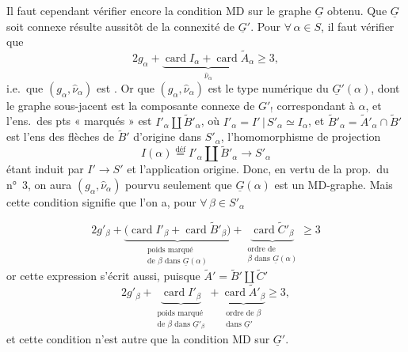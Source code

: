 \documentclass[11pt,a4paper]{article}
\begin{document}
Il faut cependant vérifier encore la condition MD sur le graphe $\underline{G}$ obtenu. Que $\underline{G}$ soit connexe résulte aussitôt de la connexité de $\underline{G}'$. Pour $\forall\, \alpha \in S$, il faut vérifier que
\[
2g_\alpha + \underbrace{\operatorname{card} I_\alpha + \operatorname{card} \widetilde{A}_\alpha}_{\hat{\nu}_\alpha} \geqslant 3,
\]
 i.e.\ que $(g_\alpha, \hat{\nu}_\alpha)$ est . Or 
  que $(g_\alpha, \hat{\nu}_\alpha)$ est le type numérique du  $\underline{G}'(\alpha)$, dont le graphe sous-jacent est la composante connexe de $G'_{!}$ correspondant à $\alpha$, et l'ens.\ des pts « marqués » est $I'_\alpha \amalg \widetilde{B}'_\alpha$, où $I'_\alpha = I' \,|\, S'_\alpha \simeq I_\alpha$, et $\widetilde{B}'_\alpha = \widetilde{A}'_\alpha \cap \widetilde{B}'$ est l'ens des flèches de $\widetilde{B}'$ d'origine dans $S'_\alpha$, l'homomorphisme de projection
\[
I(\alpha) \overset{\text{déf}}{=} I'_\alpha \amalg \widetilde{B}'_\alpha \longrightarrow S'_\alpha
\]
étant induit par $I' \to S'$ et l'application origine. Donc, en vertu de la prop.\ du n°~3, on aura $(g_\alpha, \hat{\nu}_\alpha)$  pourvu seulement que $\underline{G}(\alpha)$ est un MD-graphe. Mais cette condition signifie que l'on a, pour $\forall\, \beta \in S'_\alpha$

\[
2g'_\beta + \underbrace{\bigl(\operatorname{card} I'_\beta + \operatorname{card} \widetilde{B}'_\beta\bigr)}_{\substack{\text{poids marqué}\\ \text{de } \beta \text{ dans } \underline{G}(\alpha)}} + \underbrace{\operatorname{card} \widetilde{C}'_\beta}_{\substack{\text{ordre de}\\ \beta \text{ dans } \underline{G}(\alpha)}} \geqslant 3
\]
or cette expression s'écrit aussi, puisque $\widetilde{A}' = \widetilde{B}' \amalg \widetilde{C}'$
\[
2g'_\beta + \underbrace{\operatorname{card} I'_\beta}_{\substack{\text{poids marqué}\\ \text{de } \beta \text{ dans } \underline{G}'_\beta}} + \underbrace{\operatorname{card} \widetilde{A}'_\beta}_{\substack{\text{ordre de } \beta\\ \text{dans } \underline{G}'}} \geqslant 3,
\]
et cette condition n'est autre que la condition  MD sur $\underline{G}'$.
\end{document}
